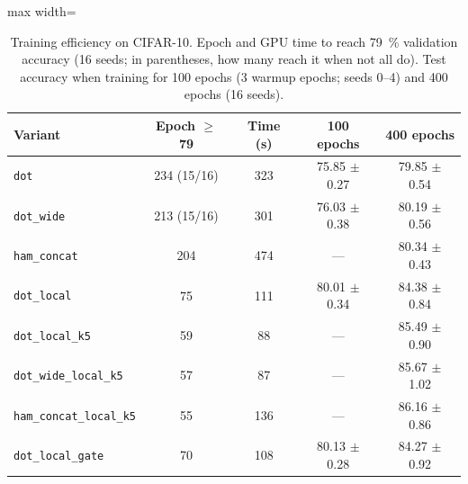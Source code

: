 
\begin{table}[!t]
\centering
\small
\caption{Training efficiency on CIFAR-10. Epoch and GPU time to reach 79~\% validation accuracy (16 seeds; in parentheses, how many reach it when not all do). Test accuracy when training for 100 epochs (3 warmup epochs; seeds 0--4) and 400 epochs (16 seeds).}
\label{tab:eficiencia}
\begin{adjustbox}{max width=\linewidth}
\begin{tabular}{lcccc}
\toprule
Variant & Epoch $\geq$79 & Time (s) & 100 epochs & 400 epochs \\
\midrule
\texttt{dot} & 234 (15/16) & 323 & 75.85 $\pm$ 0.27 & 79.85 $\pm$ 0.54 \\
\texttt{dot\_wide} & 213 (15/16) & 301 & 76.03 $\pm$ 0.38 & 80.19 $\pm$ 0.56 \\
\texttt{ham\_concat} & 204 & 474 & --- & 80.34 $\pm$ 0.43 \\
\texttt{dot\_local} & 75 & 111 & 80.01 $\pm$ 0.34 & 84.38 $\pm$ 0.84 \\
\texttt{dot\_local\_k5} & 59 & 88 & --- & 85.49 $\pm$ 0.90 \\
\texttt{dot\_wide\_local\_k5} & 57 & 87 & --- & 85.67 $\pm$ 1.02 \\
\texttt{ham\_concat\_local\_k5} & 55 & 136 & --- & 86.16 $\pm$ 0.86 \\
\texttt{dot\_local\_gate} & 70 & 108 & 80.13 $\pm$ 0.28 & 84.27 $\pm$ 0.92 \\
\bottomrule
\end{tabular}
\end{adjustbox}
\end{table}
